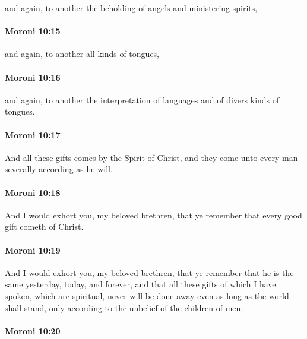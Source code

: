			and again, to another the beholding of angels and ministering spirits,

		\paragraph{Moroni 10:15} %
			\label{MORONI-10-15}

			and again, to another all kinds of tongues,

		\paragraph{Moroni 10:16} %
			\label{MORONI-10-16}

			and again, to another the interpretation of languages
			and of divers kinds of tongues.

		\paragraph{Moroni 10:17} %
			\label{MORONI-10-17}

			And all these gifts comes by the Spirit of Christ,
			and they come unto every man severally according as he will.

		\paragraph{Moroni 10:18} %
			\label{MORONI-10-18}

			And I would exhort you, my beloved brethren,
			that ye remember that every good gift cometh of Christ.

		\paragraph{Moroni 10:19} %
			\label{MORONI-10-19}

			And I would exhort you, my beloved brethren,
			that ye remember that he is the same yesterday, today, and forever,
			and that all these gifts of which I have spoken, which are spiritual,
			never will be done away even as long as the world shall stand,
			only according to the unbelief of the children of men.

		\paragraph{Moroni 10:20} %
			\label{MORONI-10-20}

